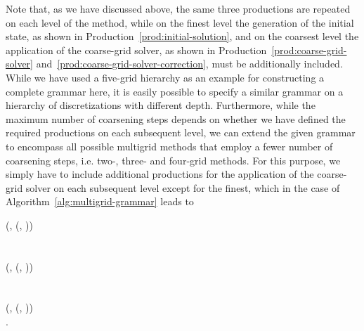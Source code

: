 Note that, as we have discussed above, the same three productions are repeated on each level of the method, while on the finest level the generation of the initial state, as shown in Production~\eqref{prod:initial-solution}, and on the coarsest level the application of the coarse-grid solver, as shown in Production~\eqref{prod:coarse-grid-solver} and~\eqref{prod:coarse-grid-solver-correction}, must be additionally included.
While we have used a five-grid hierarchy as an example for constructing a complete grammar here, it is easily possible to specify a similar grammar on a hierarchy of discretizations with different depth.
Furthermore, while the maximum number of coarsening steps depends on whether we have defined the required productions on each subsequent level, we can extend the given grammar to encompass all possible multigrid methods that employ a fewer number of coarsening steps, i.e. two-, three- and four-grid methods.
For this purpose, we simply have to include additional productions for the application of the coarse-grid solver on each subsequent level except for the finest, which in the case of Algorithm~\ref{alg:multigrid-grammar} leads to
\begin{bnf*}
	 {
		(, \bnfsp {}(, \bnfsp{}))
	} \\
	 \\ \\
	 {
		(, \bnfsp {}(, \bnfsp{}))
	} \\
	 \\ \\
	 {
		(, \bnfsp {}(, \bnfsp{}))
	} \\
	.
\end{bnf*}
\setcounter{equation}{118}


